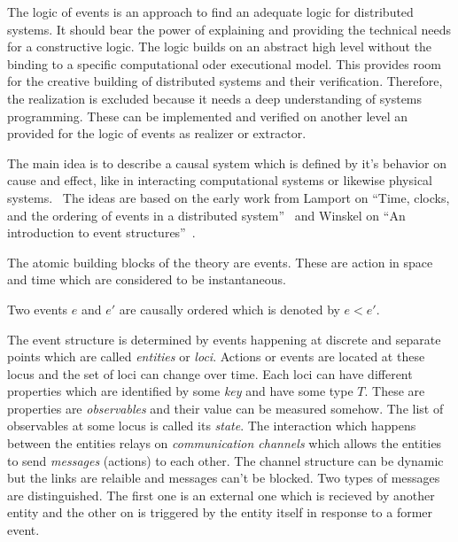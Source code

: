 The logic of events is an approach to find an adequate logic for distributed
systems. It should bear the power of explaining and providing the
technical needs for a constructive logic. The logic builds on an
abstract high level without the binding to a specific computational
oder executional model. This provides room for the creative building
of distributed systems and their verification. Therefore, the realization
is excluded because it needs a deep understanding of systems programming.
These can be implemented and verified on another level an provided for
the logic of events as realizer or extractor.~\cite{bickford2005causal}

The main idea is to describe a causal system which is defined by it's
behavior on cause and effect, like in interacting computational systems
or likewise physical systems.~\cite{bickford2005causal}
The ideas are based on the early work from Lamport on ``Time, clocks, and
the ordering of events in a distributed system''~\cite{lamport1978time}
and Winskel on ``An introduction to event
structures''~\cite{winskel1988introduction}.

The atomic building blocks of the theory are events. These are action
in space and time which are considered to be instantaneous.

\begin{defi}
  Two events $e$ and $e'$ are causally ordered which is denoted by $e<e'$.
\end{defi}

The event structure is determined by events happening at discrete and separate
points which are called \textit{entities} or \textit{loci}. Actions or events
are located at these locus and the set of loci can change over time.
Each loci can have different properties which are identified by some
\textit{key} and have some type $T$. These are properties are
\textit{observables} and their value can be measured somehow.
The list of observables at some locus is called its \textit{state}.
The interaction which happens between the entities relays on
\textit{communication channels} which allows the entities to send
\textit{messages} (actions) to each other. The channel structure
can be dynamic but the links are relaible and messages can't be blocked.
Two types of messages are distinguished. The first one is an
external one which is recieved by another entity and the other on is triggered
by the entity itself in response to a former event.~\cite{bickford2005causal}

